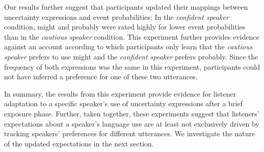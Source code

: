 \documentclass[man, floatsintext]{apa6}
\begin{document}

Our results further suggest that participants updated their mappings between uncertainty expressions and event probabilities: In the {\it confident speaker} condition, {\sc might} and {\sc probably} were rated highly for lower event probabilities than in the {\it cautious speaker} condition. This experiment further provides evidence against an account according to which participants only learn that the \emph{cautious speaker} prefers to use {\sc might} and the {\it confident speaker} prefers {\sc probably}. Since the frequency of both expressions was the same in this experiment, participants could not have inferred a preference for one of these two utterances. 


In summary, the results from this experiment provide evidence for listener adaptation to a specific speaker's use of uncertainty expressions after a brief exposure phase. Further, taken together, these experiments
suggest that listeners' expectations about a speaker's language use are at least not exclusively driven by tracking speakers' preferences for different utterances. We investigate the nature of the updated expectations
in the next section.


\end{document}
